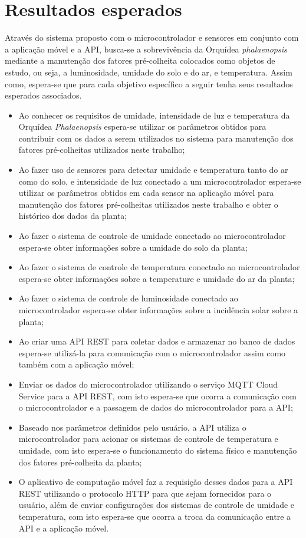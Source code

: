 \documentclass[conference]{IEEEtran}
\begin{document}
\section{Resultados esperados}
Através do sistema proposto com o microcontrolador e sensores em conjunto com a aplicação móvel e a API, busca-se a sobrevivência da Orquídea {\itshape{phalaenopsis}} mediante a manutenção dos fatores pré-colheita colocados como objetos de estudo, ou seja, a luminosidade, umidade do solo e do ar, e temperatura. Assim como, espera-se que para cada objetivo específico a seguir tenha seus resultados esperados associados.
\begin{itemize}
    \item Ao conhecer os requisitos de umidade, intensidade de luz e temperatura da Orquídea {\itshape{Phalaenopsis}} espera-se utilizar os parâmetros obtidos para contribuir com os dados a serem utilizados no sistema para manutenção dos fatores pré-colheitas utilizados neste trabalho;
    \item Ao fazer uso de sensores para detectar umidade e temperatura tanto do ar como do solo, e intensidade de luz conectado a um microcontrolador espera-se utilizar os parâmetros obtidos em cada sensor na aplicação móvel para manutenção dos fatores pré-colheitas utilizados neste trabalho e obter o histórico dos dados da planta;
    \item Ao fazer o sistema de controle de umidade conectado ao microcontrolador espera-se obter informações sobre a umidade do solo da planta;
    \item Ao fazer o sistema de controle de temperatura conectado ao microcontrolador espera-se obter informações sobre a temperature e umidade do ar da planta;
    \item Ao fazer o sistema de controle de luminosidade conectado ao microcontrolador espera-se obter informações sobre a incidência solar sobre a planta;
    \item Ao criar uma API REST para coletar dados e armazenar no banco de dados espera-se utilizá-la para comunicação com o microcontrolador assim como também com a aplicação móvel;
    \item Enviar os dados do microcontrolador utilizando o serviço MQTT Cloud Service para a API REST, com isto espera-se que ocorra a comunicação com o microcontrolador e a passagem de dados do microcontrolador para a API;
    \item Baseado nos parâmetros definidos pelo usuário, a API utiliza o microcontrolador para acionar os sistemas de controle de temperatura e umidade, com isto espera-se o funcionamento do sistema físico e manutenção dos fatores pré-colheita da planta;
    \item O aplicativo de computação móvel faz a requisição desses dados para a API REST utilizando o protocolo HTTP para que sejam fornecidos para o usuário, além de enviar configurações dos sistemas de controle de umidade e temperatura, com isto espera-se que ocorra a troca da comunicação entre a API e a aplicação móvel. 
\end{itemize}
\end{document}
